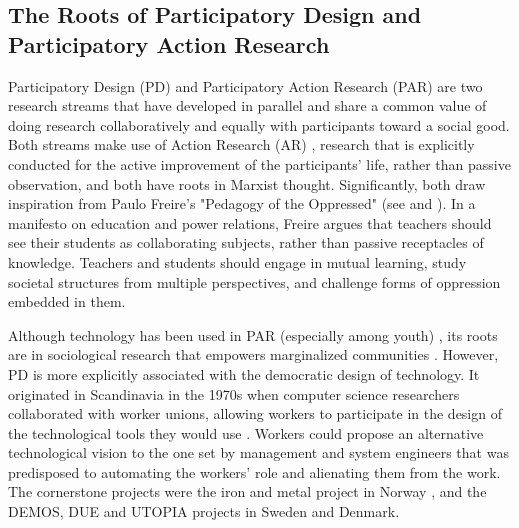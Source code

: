 \documentclass[dissertation,math,vertlayout,pdfa,colorlinks]{aaltoseries}
\begin{document}
\subsection{The Roots of Participatory Design and Participatory Action Research}
Participatory Design (PD) \cite{disalvoCommunitiesParticipatoryDesign2012} and Participatory Action Research (PAR) \cite{falsbordaAccionConocimientoComo1991} are two research streams that have developed in parallel and share a common value of doing research collaboratively and equally with participants toward a social good. Both streams make use of Action Research (AR) \cite{lewinActionResearchMinority1946}, research that is explicitly conducted for the active improvement of the participants' life, rather than passive observation, and both have roots in Marxist thought. Significantly, both draw inspiration from Paulo Freire's "Pedagogy of the Oppressed" \cite{freirePedagogyOppressed2000} (see \cite{falsbordaAccionConocimientoComo1991} and \cite{ehnWorkorientedDesignComputer1988}). In a manifesto on education and power relations, Freire argues that teachers should see their students as collaborating subjects, rather than passive receptacles of knowledge. Teachers and students should engage in mutual learning, study societal structures from multiple perspectives, and challenge forms of oppression embedded in them.

Although technology has been used in PAR (especially among youth) \cite{gibbsUsingTechnologyScale2020}, its roots are in sociological research that empowers marginalized communities \cite{falsbordaAccionConocimientoComo1991,whyteParticipatoryActionResearch1991}. However, PD is more explicitly associated with the democratic design of technology. It originated in Scandinavia in the 1970s when computer science researchers collaborated with worker unions, allowing workers to participate in the design of the technological tools they would use \cite{kensingHeritageHavingSay2012}. Workers could propose an alternative technological vision to the one set by management and system engineers that was predisposed to automating the workers' role and alienating them from the work. The cornerstone projects were the iron and metal project in Norway \cite{nygaardTradeUnionsNew1975}, and the DEMOS\cite{ehnLocalUnionInfluence1983}, DUE \cite{kyngSystemsDevelopmentTrade1982} and UTOPIA \cite{ehnToolPerspectiveDesign1986} projects in Sweden and Denmark.
\end{document}
